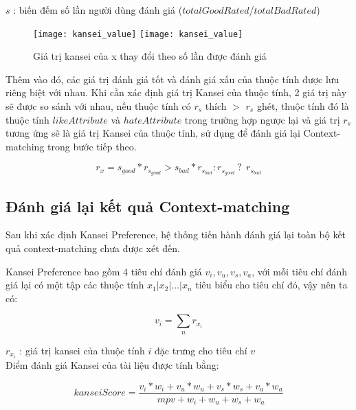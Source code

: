 $s$ : biến đếm số lần người dùng đánh giá ($totalGoodRated$/$totalBadRated$)\\

\begin{figure}[H]
  \begin{center}
    \ifpdf
      \texttt{[image: kansei\_value]}
    \else
      \texttt{[image: kansei\_value]}
    \fi
    \caption{Giá trị kansei của x thay đổi theo số lần được đánh giá}
    \label{KanseiValue}
  \end{center}
\end{figure}

Thêm vào đó, các giá trị đánh giá tốt và đánh giá xấu của thuộc tính được lưu riêng biệt với nhau. Khi cần xác định giá trị Kansei của thuộc tính, 2 giá trị này sẽ được so sánh với nhau, nếu thuộc tính có $r_s$ thích $>$ $r_s$ ghét, thuộc tính đó là thuộc tính $likeAttribute$ và $hateAttribute$ trong trường hợp ngược lại và giá trị $r_s$ tương ứng sẽ là giá trị Kansei của thuộc tính, sử dụng để đánh giá lại Context-matching trong bước tiếp theo.  

\begin{equation}
r_x = s_{good}*r_{s_{good}} > s_{bad}*r_{s_{bad}} : r_{s_{good}} \: ? \:\: r_{s_{bad}} 
\end{equation}

\subsection{Đánh giá lại kết quả Context-matching}

Sau khi xác định Kansei Preference, hệ thống tiến hành đánh giá lại toàn bộ kết quả context-matching chưa được xét đến.

Kansei Preference bao gồm 4 tiêu chí đánh giá {$v_{i},v_{u},v_{s},v_{a}$}, với mỗi tiêu  chí đánh giá lại có một tập các thuộc tính {$x_1|x_2|...|x_n$} tiêu biểu cho tiêu chí đó, vậy nên ta có:

\begin{equation}
v_i = \sum\limits_{n}{r_{x_{i}}}
\end{equation}	

$r_{x_{i}}$ : giá trị kansei của thuộc tính $i$ đặc trưng cho tiêu chí $v$ \\

Điểm đánh giá Kansei của tài liệu được tính bằng:

\begin{equation}
kanseiScore = \dfrac{v_i*w_i + v_u*w_u + v_s*w_s + v_a*w_a}{mpv+w_i+w_u+w_s+w_a}
\end{equation}

